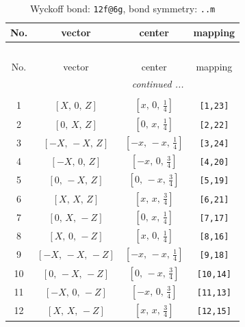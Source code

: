 \documentclass[fleqn,8pt]{jsarticle}
\begin{document}
\renewcommand{\arraystretch}{1.2}
\begin{longtable}{cccc}
\caption{Wyckoff bond: {\tt 12f@6g}, bond symmetry: {\tt ..m}}
 \\
 \hline \hline
No. & vector & center & mapping \\ \hline \endfirsthead

\multicolumn{3}{l}{\tablename\ \thetable{}} \\
 \hline \hline
No. & vector & center & mapping \\ \hline \endhead

 \hline \hline
\multicolumn{3}{r}{\footnotesize\it continued ...} \\ \endfoot

 \hline \hline
\multicolumn{3}{r}{} \\ \endlastfoot

1 & $\left[ X,\, 0,\, Z \right]$ & $\left[ x,\, 0,\, \frac{1}{4} \right]$ & {\tt [1,23]} \\ \hline
2 & $\left[ 0,\, X,\, Z \right]$ & $\left[ 0,\, x,\, \frac{1}{4} \right]$ & {\tt [2,22]} \\ \hline
3 & $\left[ - X,\, - X,\, Z \right]$ & $\left[ - x,\, - x,\, \frac{1}{4} \right]$ & {\tt [3,24]} \\ \hline
4 & $\left[ - X,\, 0,\, Z \right]$ & $\left[ - x,\, 0,\, \frac{3}{4} \right]$ & {\tt [4,20]} \\ \hline
5 & $\left[ 0,\, - X,\, Z \right]$ & $\left[ 0,\, - x,\, \frac{3}{4} \right]$ & {\tt [5,19]} \\ \hline
6 & $\left[ X,\, X,\, Z \right]$ & $\left[ x,\, x,\, \frac{3}{4} \right]$ & {\tt [6,21]} \\ \hline
7 & $\left[ 0,\, X,\, - Z \right]$ & $\left[ 0,\, x,\, \frac{1}{4} \right]$ & {\tt [7,17]} \\ \hline
8 & $\left[ X,\, 0,\, - Z \right]$ & $\left[ x,\, 0,\, \frac{1}{4} \right]$ & {\tt [8,16]} \\ \hline
9 & $\left[ - X,\, - X,\, - Z \right]$ & $\left[ - x,\, - x,\, \frac{1}{4} \right]$ & {\tt [9,18]} \\ \hline
10 & $\left[ 0,\, - X,\, - Z \right]$ & $\left[ 0,\, - x,\, \frac{3}{4} \right]$ & {\tt [10,14]} \\ \hline
11 & $\left[ - X,\, 0,\, - Z \right]$ & $\left[ - x,\, 0,\, \frac{3}{4} \right]$ & {\tt [11,13]} \\ \hline
12 & $\left[ X,\, X,\, - Z \right]$ & $\left[ x,\, x,\, \frac{3}{4} \right]$ & {\tt [12,15]} \\
\end{longtable}
\end{document}
